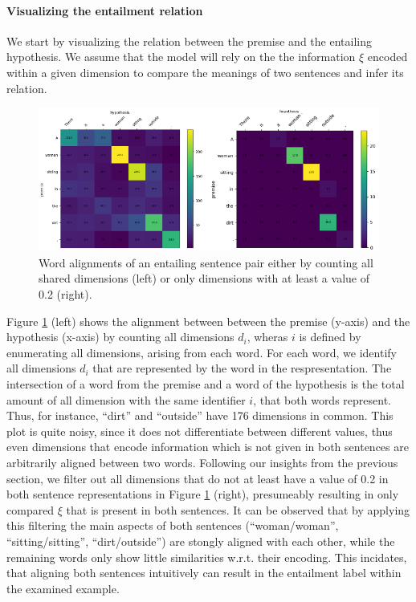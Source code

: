 \paragraph*{Visualizing the entailment relation}
We start by visualizing the relation between the premise and the entailing hypothesis. We assume that the model will rely on the the information $\xi$ encoded within a given dimension to compare the meanings of two sentences and infer its relation. 
\begin{figure}[tph!]
\centering
	\includegraphics[totalheight=7cm]{fig/alignment_entailment_sample_general.png}
	\caption{Word alignments of an entailing sentence pair either by counting all shared dimensions (left) or only dimensions with at least a value of 0.2 (right).}
	\label{fig:alignment_entailment_sample_general}
\end{figure}
Figure \ref{fig:alignment_entailment_sample_general} (left) shows the alignment between between the premise (y-axis) and the hypothesis (x-axis) by counting all dimensions $d_i$, wheras $i$ is defined by enumerating all dimensions, arising from each word. For each word, we identify all dimensions $d_i$ that are represented by the word in the respresentation. The intersection of a word from the premise and a word of the hypothesis is the total amount of all dimension with the same identifier $i$, that both words represent. Thus, for instance, ``dirt'' and ``outside'' have 176 dimensions in common. This plot is quite noisy, since it does not differentiate between different values, thus even dimensions that encode information which is not given in both sentences are arbitrarily aligned between two words. Following our insights from the previous section, we filter out all dimensions that do not at least have a value of 0.2 in both sentence representations in Figure \ref{fig:alignment_entailment_sample_general} (right), presumeably resulting in only compared $\xi$ that is present in both sentences. It can be observed that by applying this filtering the main aspects of both sentences (``woman/woman'', ``sitting/sitting'', ``dirt/outside'') are stongly aligned with each other, while the remaining words only show little similarities w.r.t. their encoding. This incidates, that aligning both sentences intuitively can result in the entailment label within the examined example.
\newline


